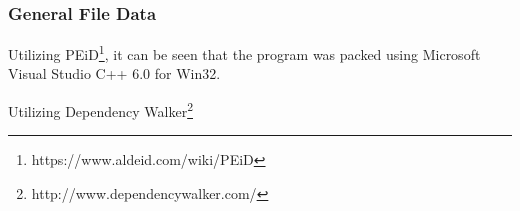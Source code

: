 \documentclass[10pt]{article} %
\begin{document}
\subsubsection{General File Data}

Utilizing PEiD\footnote{https://www.aldeid.com/wiki/PEiD}, it can be seen that the program was packed using Microsoft Visual Studio C++ 6.0 for Win32. 

Utilizing Dependency Walker\footnote{http://www.dependencywalker.com/}
\end{document}
